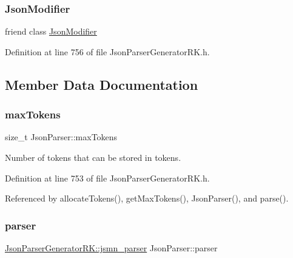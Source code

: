 \subsubsection{\texorpdfstring{Json\+Modifier}{JsonModifier}}
{\footnotesize\ttfamily friend class \hyperlink{class_json_modifier}{Json\+Modifier}\hspace{0.3cm}{\ttfamily [friend]}}



Definition at line 756 of file Json\+Parser\+Generator\+R\+K.\+h.



\subsection{Member Data Documentation}
\mbox{\label{class_json_parser_a0dfa97de05bac37c5be2e1ee9747b8a2}} 
\subsubsection{\texorpdfstring{max\+Tokens}{maxTokens}}
{\footnotesize\ttfamily size\+\_\+t Json\+Parser\+::max\+Tokens\hspace{0.3cm}{\ttfamily [protected]}}



Number of tokens that can be stored in tokens. 



Definition at line 753 of file Json\+Parser\+Generator\+R\+K.\+h.



Referenced by allocate\+Tokens(), get\+Max\+Tokens(), Json\+Parser(), and parse().

\mbox{\label{class_json_parser_ad8d3dc7a971bd6c8e578518ba6c874f9}} 
\subsubsection{\texorpdfstring{parser}{parser}}
{\footnotesize\ttfamily \hyperlink{struct_json_parser_generator_r_k_1_1jsmn__parser}{Json\+Parser\+Generator\+R\+K\+::jsmn\+\_\+parser} Json\+Parser\+::parser\hspace{0.3cm}{\ttfamily [protected]}}



